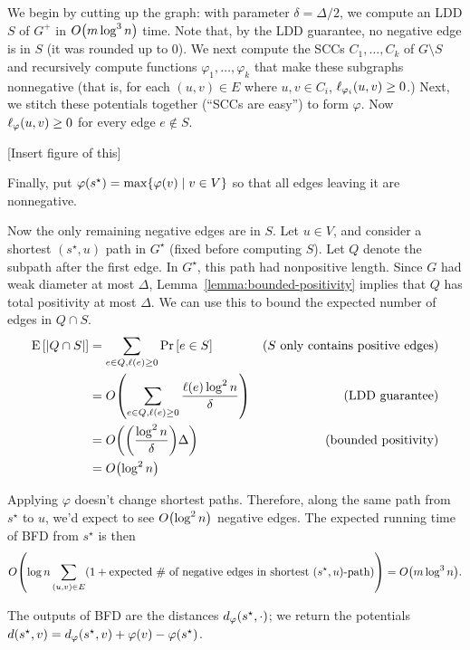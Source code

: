 \documentclass[12pt]{article}
\begin{document}
We begin by cutting up the graph: with parameter $\delta = \Delta/2$, we compute
an LDD $S$ of $G^+$ in $\bigO{m \log^3 n}$ time. Note that, by the LDD
guarantee, no negative edge is in $S$ (it was rounded up to $0$). We next
compute the SCCs $C_1, \dots, C_k$ of $G \setminus S$ and recursively compute
functions $\varphi_1, \dots, \varphi_k$ that make these subgraphs nonnegative
(that is, for each $(u, v) \in E$ where $u, v \in C_i$,
$\len{u, v}_{\varphi_i} \geq 0$.) Next, we stitch these potentials together
(``SCCs are easy'') to form $\varphi$. Now $\len{u, v}_\varphi \geq 0$ for every
edge $e \notin S$.
\begin{center}
  [Insert figure of this]
\end{center}

Finally, put $\varphi(s^\star) = \max\Set{\varphi(v) \mid v \in V}$ so that all
edges leaving it are nonnegative.

Now the only remaining negative edges are in $S$. Let $u \in V$, and consider a
shortest $(s^\star, u)$ path in $G^\star$ (fixed before computing $S$). Let $Q$
denote the subpath after the first edge. In $G^\star$, this path had nonpositive
length. Since $G$ had weak diameter at most $\Delta$,
Lemma~\ref{lemma:bounded-positivity} implies that $Q$ has total positivity at
most $\Delta$. We can use this to bound the expected number of edges in
$Q \cap S$.
\begin{align*}
  \E{\sizeof{Q \cap S}} & = \sum_{e \in Q, \len{e} \geq 0}\Pr{e \in S}                          & \text{($S$ only contains positive edges)} \\
                        & = \bigO{\sum_{e \in Q, \len{e} \geq 0}\frac{\len{e}\log^2 n}{\delta}} & \text{(LDD guarantee)}                    \\
                        & = \bigO{\prac{\log^2 n}{\delta}\Delta}                                & \text{(bounded positivity)}               \\
                        & = \bigO{\log^2 n}
\end{align*}

Applying $\varphi$ doesn't change shortest paths. Therefore, along the same path
from $s^\star$ to $u$, we'd expect to see $\bigO{\log^2 n}$ negative edges. The
expected running time of BFD from $s^\star$ is then
\[
  \bigO{\log n \sum_{(u, v) \in E}\paren{1 + \text{expected \# of negative edges
        in shortest $(s^\star, u)$-path}}}
  = \bigO{m\log^3 n}.
\]

The outputs of BFD are the distances $\dist{ s^\star, \cdot }_\varphi$; we
return the potentials
$\dist{s^\star, v} = \dist{s^\star, v}_\varphi + \varphi(v) - \varphi(s^\star)$.
\end{document}
